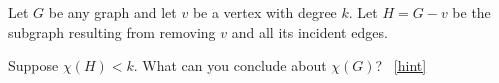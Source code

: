 \documentclass{book}
\begin{document}
\setcounter{project}{44}
\addtocounter{project}{-1}
\begin{activity}[]\label{activity-37}
\hypertarget{p-413}{}%
Let \(G\) be any graph and let \(v\) be a vertex with degree \(k\).  Let \(H = G - v\) be the subgraph resulting from removing \(v\) and all its incident edges.%
\par
\hypertarget{p-414}{}%
Suppose \(\chi(H) \lt k\).  What can you conclude about \(\chi(G)\)?%
~\hfill{\tiny\hyperlink{a-44}{[hint]}\hypertarget{q-44}{}}\end{activity}
\end{document}
